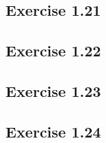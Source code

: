 \documentclass[../A&M.tex]{subfiles}
\begin{document}
\subsection*{Exercise 1.21}

\begin{comment}
(i) $\qfk\in\phi^{*^{-1}}(X_f) \iff \phi^*(\qfk) = \phi^{-1}(\qfk) \in X_f \iff f\notin \phi^{-1}(\qfk) \iff \phi(f)\notin\qfk \iff \qfk\in Y_{\phi(f)}$.

(ii) Note that $\qfk\in\phi^{*^{-1}}(V(\afk)) \iff \phi^*(\qfk) = \phi^{-1}(\qfk) =\qfk^c \in V(\afk) \iff \afk\sbe q^c$. So it's remaining to show that $\afk\sbe \qfk^c$ if and only if $\afk^e \sbe \qfk$. By (1.17) (i), if $\afk\sbe\qfk^c$, then $\afk^e\sbe\qfk^{ce} \sbe \qfk$. And conversely, if $\afk^e \sbe \qfk$, then $\afk \sbe \afk^{ec} \sbe \qfk^c$.

(iii) First, we claim that $\phi^*(V(\bfk)) \sbe V(\bfk^c)$. (Then $\ovl{\phi^*(V(\bfk))}  \sbe V(\bfk^c)$.) If $\pfk \in \phi^*(V(\bfk))$, then there exists $\qfk\spe\bfk$ s.t. $\phi^*(\qfk)=\pfk$. So $\bfk^c \sbe \qfk^c = \phi^{-1}(\qfk) = \phi^*(\qfk)=\pfk$ and hence $\pfk\in V(\bfk^c)$.

Conversely, let $V(\afk)$ be any closed set s.t. $\phi^*(V(\bfk)) \sbe V(\afk)$. We claim that $V(\bfk^c) \sbe V(\afk)$. (Then $\ovl{\phi^*(V(\bfk))}  \spe V(\bfk^c)$.) Given $\pfk \in V(\bfk^c)$. By Exercise 1.15 (i) and (1.18), we have $V(\bfk^c) = V(r(\bfk^c)) = V(r(\bfk)^c)$. So $\pfk\in V(r(\bfk)^c)$. By (1.14) and (1.13) (i),
$$
\pfk \spe r(\bfk)^c = \left( \bigcap_{\qfk \in V(\bfk)} \qfk \right)^c = \bigcap_{\qfk \in V(\bfk)} \qfk^c = \bigcap_{\qfk \in V(\bfk)} \phi^*(\qfk) = \bigcap_{\pfk \in \phi^*(V(\bfk))} \pfk \spe \bigcap_{\pfk \in V(\afk)} \pfk = r(\afk) \spe \afk 
$$
Thus, $\pfk\in V(\afk)$.
\end{comment}

\subsection*{Exercise 1.22}

\subsection*{Exercise 1.23}

\subsection*{Exercise 1.24}
\end{document}
